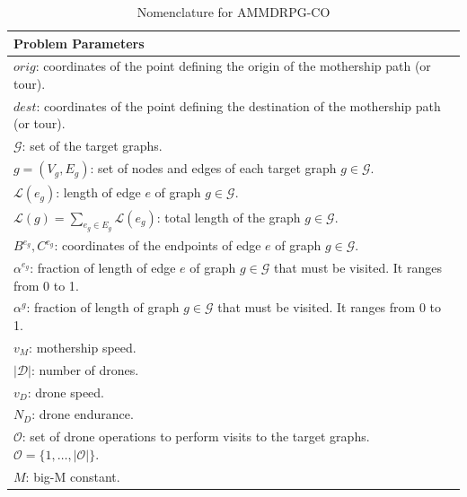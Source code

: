 \documentclass[10pt,a4paper]{elsarticle}
\newcommand{\EN}[1]{{\color{black}#1}}
\begin{document}
\begin{table}[!h]
\scriptsize
\centering
\begin{tabular}{ | l | }
	\hline
	\textbf{Problem Parameters}\\
	\hline
	$orig$: coordinates of the point defining the origin of the mothership path (or tour).\\
	$dest$: coordinates of the point defining the destination of the mothership path (or tour).\\
	$\mathcal{G}$: set of the target graphs.\\
	$g = (V_g, E_g)$: set of nodes and edges of each target graph $g \in \mathcal{G}$.\\
	$\mathcal{L}(e_g)$: length of edge $e$ of graph $g \in \mathcal{G}$.\\
	$\mathcal{L}(g)=\sum_{e_g\in E_g} \mathcal L(e_g)$: total length of the graph $g\in\mathcal G$.\\
	$B^{e_g}, C^{e_g}$: coordinates of the endpoints of edge $e$ of graph $g \in \mathcal{G}$.\\
	$\alpha^{e_g}$: fraction of length of edge $e$ of graph $g \in \mathcal{G}$ that must be visited. It ranges \EN{from 0 to 1}. \\
	$\alpha^{g}$: fraction of length of graph $g \in \mathcal{G}$ that must be visited. It ranges \EN{from 0 to 1.}\\
	$v_M$: mothership speed.\\
	$|\mathcal D|$: number of drones.\\
	$v_D$: drone speed.\\
	$N_D$: drone endurance. \\
	$\mathcal{O}$: set of drone operations to perform visits to the target graphs. $\mathcal{O} =\{1,\ldots,|\mathcal{O}|\}$.\\
	$M$: big-M constant.\\
	\hline
\end{tabular}
\caption{Nomenclature for AMMDRPG-CO}
\label{table:t1}
\end{table}
\end{document}

